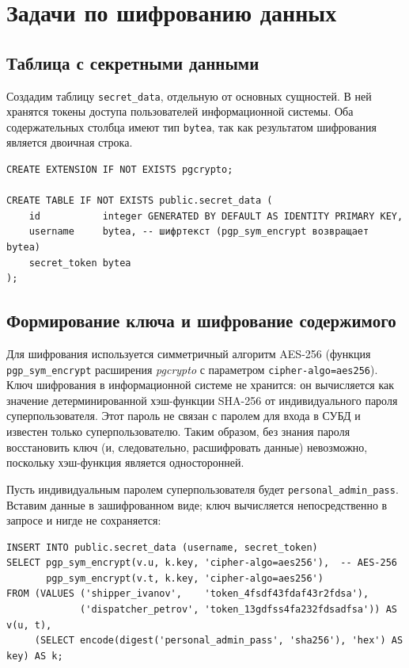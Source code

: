 \documentclass[a4paper,14pt]{article}
\begin{document}
\newpage
\section{Задачи по шифрованию данных}

\subsection{Таблица с секретными данными}
Создадим таблицу \texttt{secret\_data}, отдельную от основных сущностей. В ней хранятся токены доступа пользователей информационной системы. Оба содержательных столбца имеют тип \texttt{bytea}, так как результатом шифрования является двоичная строка.

\begin{lstlisting}
CREATE EXTENSION IF NOT EXISTS pgcrypto;

CREATE TABLE IF NOT EXISTS public.secret_data (
    id           integer GENERATED BY DEFAULT AS IDENTITY PRIMARY KEY,
    username     bytea, -- шифртекст (pgp_sym_encrypt возвращает bytea)
    secret_token bytea
);
\end{lstlisting}

\subsection{Формирование ключа и шифрование содержимого}
Для шифрования используется симметричный алгоритм AES-256 (функция \texttt{pgp\_sym\_encrypt} расширения \textit{pgcrypto} с параметром \texttt{cipher-algo=aes256}). Ключ шифрования в информационной системе не хранится: он вычисляется как значение детерминированной хэш-функции SHA-256 от индивидуального пароля суперпользователя. Этот пароль не связан с паролем для входа в СУБД и известен только суперпользователю. Таким образом, без знания пароля восстановить ключ (и, следовательно, расшифровать данные) невозможно, поскольку хэш-функция является односторонней.

Пусть индивидуальным паролем суперпользователя будет \texttt{personal\_admin\_pass}. Вставим данные в зашифрованном виде; ключ вычисляется непосредственно в запросе и нигде не сохраняется:

\begin{lstlisting}
INSERT INTO public.secret_data (username, secret_token)
SELECT pgp_sym_encrypt(v.u, k.key, 'cipher-algo=aes256'),  -- AES-256
       pgp_sym_encrypt(v.t, k.key, 'cipher-algo=aes256')
FROM (VALUES ('shipper_ivanov',    'token_4fsdf43fdaf43r2fdsa'),
             ('dispatcher_petrov', 'token_13gdfss4fa232fdsadfsa')) AS v(u, t),
     (SELECT encode(digest('personal_admin_pass', 'sha256'), 'hex') AS key) AS k;
\end{lstlisting}
\end{document}
